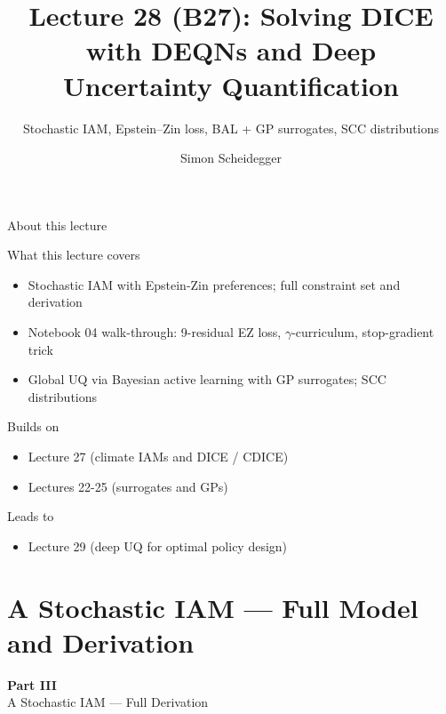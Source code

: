 \documentclass[aspectratio=169,11pt]{beamer}
\title[Lecture 28 (B27)]{Lecture 28 (B27): Solving DICE with DEQNs and Deep Uncertainty Quantification}
\subtitle{Stochastic IAM, Epstein--Zin loss, BAL + GP surrogates, SCC distributions}
\author{Simon Scheidegger}
\institute{HEC, University of Lausanne}
\date{}
\begin{document}
\providecommand{\exercisepause}{%
  \tikz[baseline=(X.base)]{\node[fill=darkgreen!80!black, text=white,
  rounded corners=2pt, inner sep=3pt, font=\scriptsize\bfseries](X){PAUSE};}}

{
\begin{frame}
\titlepage
\end{frame}
}

\begin{frame}{About this lecture}
\small
\begin{block}{What this lecture covers}
\begin{itemize}\itemsep2pt
  \item Stochastic IAM with Epstein-Zin preferences; full constraint set and derivation
  \item Notebook 04 walk-through: 9-residual EZ loss, $\gamma$-curriculum, stop-gradient trick
  \item Global UQ via Bayesian active learning with GP surrogates; SCC distributions
\end{itemize}
\end{block}
\begin{block}{Builds on}
\begin{itemize}\itemsep2pt
  \item Lecture 27 (climate IAMs and DICE / CDICE)
  \item Lectures 22-25 (surrogates and GPs)
\end{itemize}
\end{block}
\begin{block}{Leads to}
\begin{itemize}\itemsep2pt
  \item Lecture 29 (deep UQ for optimal policy design)
\end{itemize}
\end{block}
\end{frame}

\section{A Stochastic IAM --- Full Model and Derivation}

\begin{frame}{}
\vfill
\begin{center}
{\Huge \textcolor{uzhblue}{\textbf{Part III}}}\\[12pt]
{\LARGE A Stochastic IAM --- Full Derivation}
\end{center}
\vfill
\end{frame}
\end{document}
